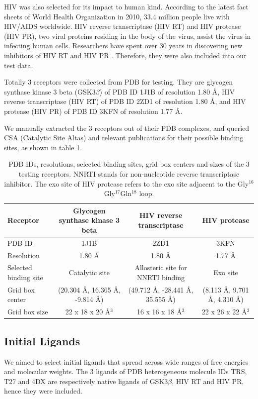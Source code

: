 \documentclass[10pt,conference,letterpaper]{IEEEtran}
\begin{document}
HIV was also selected for its impact to human kind. According to the latest fact sheets of World Health Organization in 2010, 33.4 million people live with HIV/AIDS worldwide.
HIV reverse transcriptase (HIV RT) and HIV protease (HIV PR), two viral proteins residing in the body of the virus, assist the virus in infecting human cells.
Researchers have spent over 30 years in discovering new inhibitors of HIV RT and HIV PR \cite{221,222,223}.
Therefore, they were also included into our test data.

Totally 3 receptors were collected from PDB \cite{96} for testing.
They are glycogen synthase kinase 3 beta (GSK3$\beta$) of PDB ID 1J1B \cite{245} of resolution 1.80 \AA, HIV reverse transcriptase (HIV RT) of PDB ID 2ZD1 \cite{180} of resolution 1.80 \AA, and HIV protease (HIV PR) of PDB ID 3KFN \cite{243} of resolution 1.77 \AA.

We manually extracted the 3 receptors out of their PDB complexes, and queried CSA (Catalytic Site Altas) \cite{206} and relevant publications \cite{245,246,180,221,222,223,243} for their possible binding sites, as shown in table \ref{tab:searchspace}.

\begin{table}
\centering
\begin{tabular}
{lccc}
\noalign{\smallskip}\toprule
Receptor & Glycogen synthase kinase 3 beta & HIV reverse transcriptase & HIV protease\\
\midrule
\noalign{\smallskip}
PDB ID & 1J1B & 2ZD1 & 3KFN\\
Resolution & 1.80 \AA & 1.80 \AA & 1.77 \AA\\
Selected binding site & Catalytic site & Allosteric site for NNRTI binding & Exo site\\
Grid box center & (20.304 \AA, 16.365 \AA, -9.814 \AA) & (49.712 \AA, -28.441 \AA, 35.555 \AA) & (8.113 \AA, 9.701 \AA, 4.310 \AA) \\
Grid box size & 22 x 18 x 20 \AA$^3$ & 16 x 16 x 18 \AA$^3$ & 22 x 26 x 22 \AA$^3$\\
\bottomrule
\end{tabular}
\caption{PDB IDs, resolutions, selected binding sites, grid box centers and sizes of the 3 testing receptors. NNRTI stands for non-nucleotide reverse transcriptase inhibitor. The exo site of HIV protease refers to the exo site adjacent to the Gly$^{16}$Gly$^{17}$Gln$^{18}$ loop.}
\label{tab:searchspace}
\end{table}

\subsection{Initial Ligands}
We aimed to select initial ligands that spread across wide ranges of free energies and molecular weights.
The 3 ligands of PDB heterogeneous molecule IDs TRS, T27 and 4DX are respectively native ligands of GSK3$\beta$, HIV RT and HIV PR, hence they were included.
\end{document}
